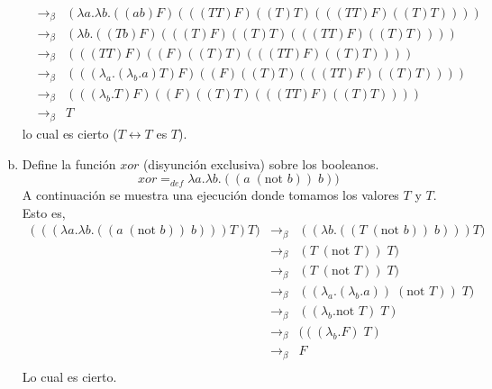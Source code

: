 \begin{enumerate}[a)]
\begin{eqnarray*}
                &\rightarrow_{\beta}&
                (\lambda a. \lambda b.((ab)F) (((TT)F) ((T)T)(((TT)F) ((T)T))))\\
                &\rightarrow_{\beta}&
                (\lambda b.((Tb)F) (((T)F) ((T)T)(((TT)F) ((T)T))))\\
                &\rightarrow_{\beta}&
                (((TT)F) ((F) ((T)T)(((TT)F) ((T)T))))\\
                &\rightarrow_{\beta}& (((\lambda_a .(\lambda_b .a)T)F) ((F) ((T)T)(((TT)F) ((T)T))))\\
                &\rightarrow_{\beta}& (((\lambda_b .T)F) ((F) ((T)T)(((TT)F) ((T)T))))\\
                &\rightarrow_{\beta}& T
        \end{eqnarray*}
        lo cual es cierto ($T \leftrightarrow T$ es $T$).
    \item Define la función $xor$ (disyunción exclusiva) sobre los booleanos.
    \begin{equation*}
            xor =_{def} \lambda a. \lambda b.((a \; (\text{not } b)) \; b))
    \end{equation*}
    A continuación se muestra  una ejecución donde tomamos los valores $T$ y $T$. Esto es,
    \begin{eqnarray*}
        (((\lambda a. \lambda b.((a \; (\text{not } b)) \; b)))T)T) &\rightarrow_{\beta}&
        ((\lambda b.((T \; (\text{not } b)) \; b)))T)\\
        &\rightarrow_{\beta}&
        (T \; (\text{not } T)) \; T)\\
        &\rightarrow_{\beta}&
        (T \; (\text{not } T)) \; T)\\
        &\rightarrow_{\beta}&
        ((\lambda_a .(\lambda_b .a)) \; (\text{not } T)) \; T)\\
        &\rightarrow_{\beta}&
        ((\lambda_b . \text{not } T) \; T)\\
        &\rightarrow_{\beta}&
        (((\lambda_b . F) \; T)\\
        &\rightarrow_{\beta}&
        F\\ 
    \end{eqnarray*}
    Lo cual es cierto.
\end{enumerate}
